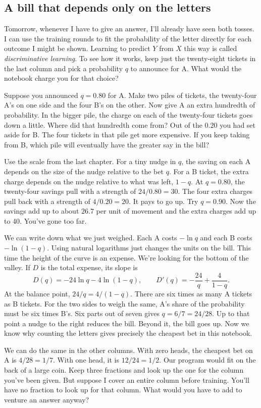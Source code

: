 \documentclass[12pt,oneside]{article}
\newcommand{\secao}[1]{\Needspace{5.2\baselineskip}\subsection*{#1}}
\newcommand{\bookanchor}[1]{\phantomsection\label{#1}}
\begin{document}
\secao{A bill that depends only on the letters}
Tomorrow,\bookanchor{topic-04-1} whenever I have to give an answer, I'll already have seen both tosses. I can use the training rounds to fit the probability of the letter directly for each outcome I might be shown. Learning to predict $Y$ from $X$ this way is called \emph{discriminative learning}. To see how it works, keep just the twenty-eight tickets in the last column and pick a probability $q$ to announce for A. What would the notebook charge you for that choice?

Suppose you announced $q=0.80$ for A. Make two piles of tickets, the twenty-four A's on one side and the four B's on the other. Now give A an extra hundredth of probability. In the bigger pile, the charge on each of the twenty-four tickets goes down a little. Where did that hundredth come from? Out of the $0.20$ you had set aside for B. The four tickets in that pile get more expensive. If you keep taking from B, which pile will eventually have the greater say in the bill?

Use the scale from the last chapter. For a tiny nudge in $q$, the saving on each A depends on the size of the nudge relative to the bet $q$. For a B ticket, the extra charge depends on the nudge relative to what was left, $1-q$. At $q=0.80$, the twenty-four savings pull with a strength of $24/0.80=30$. The four extra charges pull back with a strength of $4/0.20=20$. It pays to go up. Try $q=0.90$. Now the savings add up to about $26.7$ per unit of movement and the extra charges add up to 40. You've gone too far.

We can write down what we just weighed. Each A costs $-\ln q$ and each B costs $-\ln(1-q)$. Using natural logarithms just changes the units on the bill. This time the height of the curve is an expense. We're looking for the bottom of the valley. If $D$ is the total expense, its slope is
\[
 D(q)=-24\ln q-4\ln(1-q),\qquad
 D'(q)=-\frac{24}{q}+\frac{4}{1-q}.
\]
At the balance point, $24/q=4/(1-q)$. There are six times as many A tickets as B tickets. For the two sides to weigh the same, A's share of the probability must be six times B's. Six parts out of seven gives $q=6/7=24/28$. Up to that point a nudge to the right reduces the bill. Beyond it, the bill goes up. Now we know why counting the letters gives precisely the cheapest bet in this notebook.

We can do the same in the other columns. With zero heads, the cheapest bet on A is $4/28=1/7$. With one head, it is $12/24=1/2$. Our program would fit on the back of a large coin. Keep three fractions and look up the one for the column you've been given. But suppose I cover an entire column before training. You'll have no fraction to look up for that column. What would you have to add to venture an answer anyway?
\end{document}

